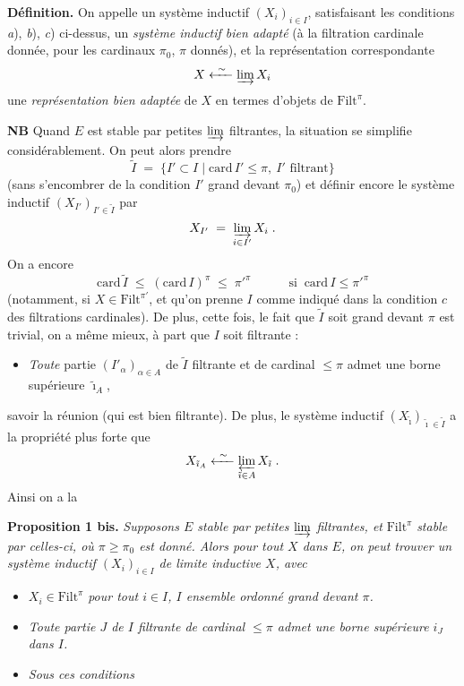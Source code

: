 \documentclass[11pt]{article}
\newcommand{\msp}[1]{\marginpar{\footnotesize [#1]}}
\newcommand{\Filt}{\mathrm{Filt}}
\newcommand{\card}{\mathrm{card}\,}
\begin{document}
\textbf{Définition.} On appelle un système inductif $(X_i)_{i\in I}$, satisfaisant les conditions \textit{a}), \textit{b}), \textit{c}) ci-dessus, un \textit{système inductif bien adapté} (à la filtration cardinale donnée, pour les cardinaux $\pi_0$, $\pi$ donnés), et la représentation correspondante
\[
X \xleftarrow{\ \sim\ } \varinjlim X_i
\]
une \textit{représentation bien adaptée} de $X$ en termes d'objets de $\Filt^\pi$.

\textbf{NB} Quand $E$ est stable par petites $\varinjlim$ filtrantes, la situation se simplifie considérablement. On peut alors prendre
\[
\tilde I \;=\; \{I'\subset I \mid \card I'\le\pi,\ I' \text{ filtrant}\}
\]
(sans s'encombrer de la condition $I'$ grand devant $\pi_0$) et définir encore le système inductif $(X_{I'})_{I'\in\tilde I}$ par
\[
X_{I'} \;=\; \varinjlim_{i\in I'} X_i \;.
\]
On a encore
\msp{page 85}
\[
\card\tilde I \;\le\; (\card I)^\pi \;\le\; \pi'^{\pi} \qquad\quad \text{si }\ \card I\le\pi'^{\pi}
\]
(notamment, si $X\in\Filt^{\pi'}$, et qu'on prenne $I$ comme indiqué dans la condition $c$ des filtrations cardinales). De plus, cette fois, le fait que $\tilde I$ soit grand devant $\pi$ est trivial, on a même mieux, à part que $I$ soit filtrante :

\begin{itemize}
\item[$(*)$] \textit{Toute} partie $(I'_\alpha)_{\alpha\in A}$ de $\tilde I$ filtrante et de cardinal $\le\pi$ admet une borne supérieure $\tilde\imath_A$,
\end{itemize}

savoir la réunion (qui est bien filtrante). De plus, le système inductif $(X_{\tilde\imath})_{\tilde\imath\in\tilde I}$ a la propriété plus forte que
\[
X_{\tilde\imath_A} \xleftarrow{\ \sim\ } \varprojlim_{\tilde\imath\in A} X_{\tilde\imath} \;. %
\]
Ainsi on a la

\textbf{Proposition 1 bis.} \textit{Supposons $E$ stable par petites $\varinjlim$ filtrantes, et} $\Filt^\pi$ \textit{stable par celles-ci, où $\pi\ge\pi_0$ est donné. Alors pour tout $X$ dans $E$, on peut trouver un système inductif $(X_i)_{i\in I}$ de limite inductive $X$, avec}

\begin{itemize}
\item[a)] $X_i\in\Filt^\pi$ \textit{pour tout $i\in I$, $I$ ensemble ordonné grand devant $\pi$.}
\item[b)] \textit{Toute partie $J$ de $I$ filtrante de cardinal $\le\pi$ admet une borne supérieure $i_J$ dans $I$.}
\item[c)] \textit{Sous ces conditions}
\end{itemize}
\end{document}

